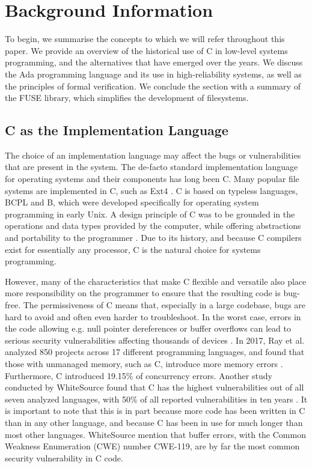 \section{Background Information}
To begin, we summarise the concepts to which we will refer throughout this paper.
We provide an overview of the historical use of C in low-level systems programming, and the alternatives that have emerged over the years.
We discuss the Ada programming language and its use in high-reliability systems, as well as the principles of formal verification.
We conclude the section with a summary of the FUSE library, which simplifies the development of filesystems.

\subsection{C as the Implementation Language}
The choice of an implementation language may affect the bugs or vulnerabilities that are present in the system.
The de-facto standard implementation language for operating systems and their components has long been C.
Many popular file systems are implemented in C, such as Ext4 \cite{ext4code}.
C is based on typeless languages, BCPL and B, which were developed specifically for operating system programming in early Unix.
A design principle of C was to be grounded in the operations and data types provided by the computer, while offering abstractions and portability to the programmer \cite{ritchie1993}.
Due to its history, and because C compilers exist for essentially any processor, C is the natural choice for systems programming.

However, many of the characteristics that make C flexible and versatile also place more responsibility on the programmer to ensure that the resulting code is bug-free.
The permissiveness of C means that, especially in a large codebase, bugs are hard to avoid and often even harder to troubleshoot.
In the worst case, errors in the code allowing e.g. null pointer dereferences or buffer overflows can lead to serious security vulnerabilities affecting thousands of devices \cite{cert2001}.
In 2017, Ray et al. analyzed 850 projects across 17 different programming languages, and found that those with unmanaged memory, such as C, introduce more memory errors \cite{ray2017}.
Furthermore, C introduced 19.15\% of concurrency errors.
Another study conducted by WhiteSource found that C has the highest vulnerabilities out of all seven analyzed languages, with 50\% of all reported vulnerabilities in ten years \cite{whitesource2019}.
It is important to note that this is in part because more code has been written in C than in any other language, and because C has been in use for much longer than most other languages.
WhiteSource mention that buffer errors, with the Common Weakness Enumeration (CWE) number CWE-119, are by far the most common security vulnerability in C code.


